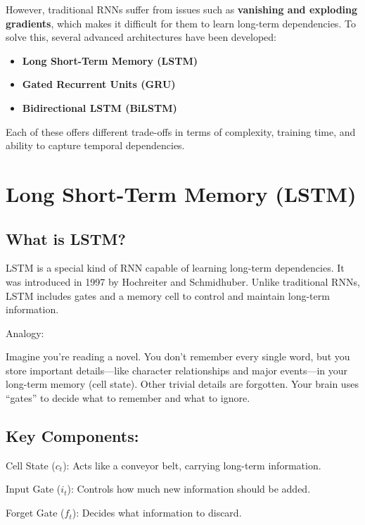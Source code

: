 \documentclass[
  letterpaper,
  DIV=11,
  numbers=noendperiod]{scrreprt}
\providecommand{\tightlist}{%
  \setlength{\itemsep}{0pt}\setlength{\parskip}{0pt}}\usepackage{longtable,booktabs,array}
\begin{document}
However, traditional RNNs suffer from issues such as \textbf{vanishing
and exploding gradients}, which makes it difficult for them to learn
long-term dependencies. To solve this, several advanced architectures
have been developed:

\begin{itemize}
\tightlist
\item
  \textbf{Long Short-Term Memory (LSTM)}
\item
  \textbf{Gated Recurrent Units (GRU)}
\item
  \textbf{Bidirectional LSTM (BiLSTM)}
\end{itemize}

Each of these offers different trade-offs in terms of complexity,
training time, and ability to capture temporal dependencies.

\section{Long Short-Term Memory
(LSTM)}\label{long-short-term-memory-lstm}

\subsection{What is LSTM?}\label{what-is-lstm}

LSTM is a special kind of RNN capable of learning long-term
dependencies. It was introduced in 1997 by Hochreiter and Schmidhuber.
Unlike traditional RNNs, LSTM includes gates and a memory cell to
control and maintain long-term information.

Analogy:

Imagine you're reading a novel. You don't remember every single word,
but you store important details---like character relationships and major
events---in your long-term memory (cell state). Other trivial details
are forgotten. Your brain uses ``gates'' to decide what to remember and
what to ignore.

\subsection{Key Components:}\label{key-components-1}

Cell State (\(c_t\)): Acts like a conveyor belt, carrying long-term
information.

Input Gate (\(i_t\)): Controls how much new information should be added.

Forget Gate (\(f_t\)): Decides what information to discard.
\end{document}
